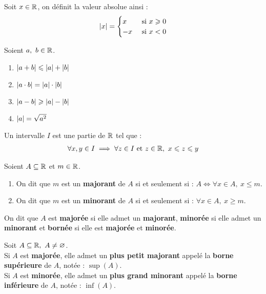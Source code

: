 \begin{definition}
    Soit $x \in \mathbb{R}$, on définit la valeur absolue ainsi :
    \begin{align*}
        \abs{x} =
        \begin{cases}
            x &\text{ si } x \geqslant 0 \\
            -x &\text{ si } x < 0
        \end{cases}
    \end{align*}
\end{definition}

\begin{proposition}
   	Soient $a,\ b \in \mathbb{R}$.
    \begin{enumerate}
            \item $\abs{a + b} \leqslant \abs{a} + \abs{b}$
            \item $\abs{a \cdot b} = \abs{a} \cdot \abs{b}$
            \item $\abs{a - b} \geqslant \abs{a} - \abs{b}$
            \item $\abs{a} = \sqrt{a^2}$
        \end{enumerate}
\end{proposition}

\begin{definition}[Intervalle]
    Un intervalle $I$ est une partie de $\mathbb{R}$ tel que :
    \begin{align*}
        \forall x, y \in I \implies \forall z \in I \text{ et } z \in \mathbb{R},\ x \leqslant z \leqslant y
    \end{align*}
\end{definition}

\begin{definition}
    Soient $A \subseteq \mathbb{R}$ et $m \in \mathbb{R}$.
    \begin{enumerate}
        \item On dit que $m$ est un \textbf{majorant} de $A$ si et seulement si : $A \iff \forall x \in A,\ x \leq m$.
        \item On dit que $m$ est un \textbf{minorant} de $A$ si et seulement si : $\forall x \in A,\ x \geq m$.
    \end{enumerate}
    On dit que $A$ est \textbf{majorée} si elle admet un \textbf{majorant}, \textbf{minorée} si elle admet un \textbf{minorant} et \textbf{bornée} si elle est \textbf{majorée} et \textbf{minorée}.
\end{definition}

\begin{theorem}
    Soit $A \subseteq \mathbb{R},\ A \neq \varnothing$. \\
    Si $A$ est \textbf{majorée}, elle admet un \textbf{plus petit majorant} appelé la \textbf{borne supérieure} de $A$, notée : $\sup(A)$.
    \\
    Si $A$ est \textbf{minorée}, elle admet un \textbf{plus grand minorant} appelé la \textbf{borne inférieure} de $A$, notée : $\inf(A)$.
\end{theorem}

